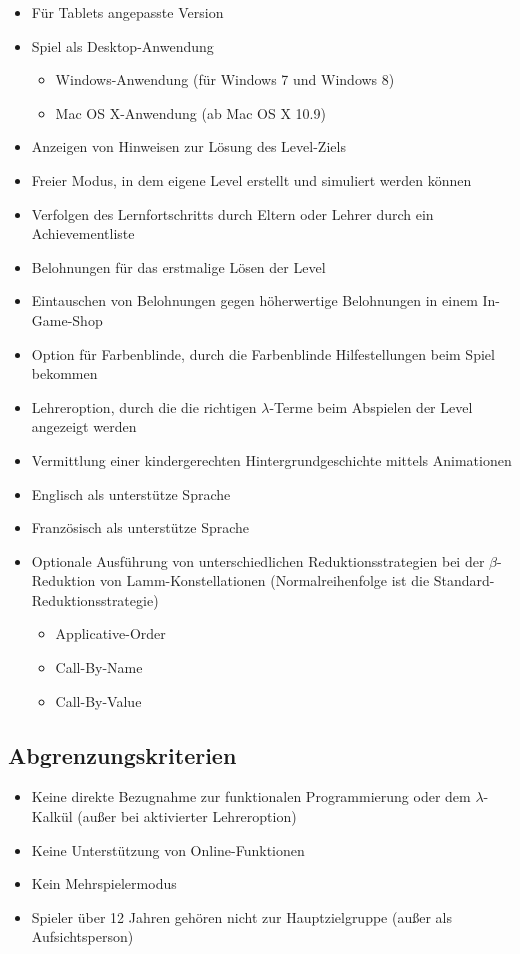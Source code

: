 \begin{itemize}
	\item Für Tablets angepasste Version
	\item Spiel als Desktop-Anwendung
	\begin{itemize}
		\item Windows-Anwendung (für Windows 7 und Windows 8)
		\item Mac OS X-Anwendung (ab Mac OS X 10.9)
	\end{itemize}
	\item Anzeigen von Hinweisen zur Lösung des Level-Ziels
	\item Freier Modus, in dem eigene Level erstellt und simuliert werden können
	\item Verfolgen des Lernfortschritts durch Eltern oder Lehrer durch ein Achievementliste
	\item Belohnungen für das erstmalige Lösen der Level
	\item Eintauschen von Belohnungen gegen höherwertige Belohnungen in einem In-Game-Shop
	\item Option für Farbenblinde, durch die Farbenblinde Hilfestellungen beim Spiel bekommen
	\item Lehreroption, durch die die richtigen $\lambda$-Terme beim Abspielen der Level angezeigt werden
	\item Vermittlung einer kindergerechten Hintergrundgeschichte mittels Animationen
	\item Englisch als unterstütze Sprache
	\item Französisch als unterstütze Sprache
	\item Optionale Ausführung von unterschiedlichen Reduktionsstrategien bei der $\beta$-Reduktion von Lamm-Konstellationen (Normalreihenfolge ist die Standard-Reduktionsstrategie)
	\begin{itemize}
		\item Applicative-Order
		\item Call-By-Name
		\item Call-By-Value
	\end{itemize}
		
\end{itemize}

\subsection{Abgrenzungskriterien}

\begin{itemize}
	\item Keine direkte Bezugnahme zur funktionalen Programmierung oder dem $\lambda$-Kalkül (außer bei aktivierter Lehreroption) 
	\item Keine Unterstützung von Online-Funktionen
	\item Kein Mehrspielermodus
	\item Spieler über 12 Jahren gehören nicht zur Hauptzielgruppe (außer als Aufsichtsperson)
\end{itemize}

